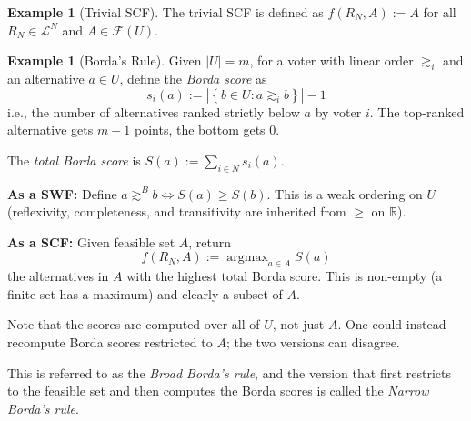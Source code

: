 \documentclass{book}
\theoremstyle{plain}
\theoremstyle{definition}
\newtheorem{example}[theorem]{Example}
\theoremstyle{remark}
\newcommand{\set}[1]{\left\{#1\right\}}
\begin{document}
\begin{example}[Trivial SCF]
    The trivial SCF is defined as $f(R_N, A) := A$ for all $R_N \in \mathcal{L}^N$ and $A \in \mathcal{F}(U)$.
\end{example}

\begin{example}[Borda's Rule]
    Given $|U| = m$, for a voter with linear order $\gtrsim_i$ 
    and an alternative $a \in U$, define the \emph{Borda score} as
    \[
        s_i(a) := |\set{b \in U : a \gtrsim_i b}| - 1
    \]
    i.e., the number of alternatives ranked strictly below $a$ by voter $i$.
    The top-ranked alternative gets $m - 1$ points, the bottom gets $0$.

    The \emph{total Borda score} is $S(a) := \sum_{i \in N} s_i(a)$.

    \textbf{As a SWF:} Define $a \gtrsim^B b \iff S(a) \geq S(b)$.
    This is a weak ordering on $U$ 
    (reflexivity, completeness, and transitivity 
    are inherited from $\geq$ on $\mathbb{R}$).

    \textbf{As a SCF:} Given feasible set $A$, return 
    \[
        f(R_N, A) := \operatorname{argmax}_{a \in A} S(a)
    \]
    the alternatives in $A$ with the highest total Borda score.
    This is non-empty (a finite set has a maximum) 
    and clearly a subset of $A$.

    Note that the scores are computed over all of $U$, not just $A$.
    One could instead recompute Borda scores restricted to $A$; 
    the two versions can disagree. %

    This is referred to as the \emph{Broad Borda's rule},
    and the version that first 
    restricts to the feasible set and then computes the
    Borda scores is called the \emph{Narrow Borda's rule}.
\end{example}
\end{document}
